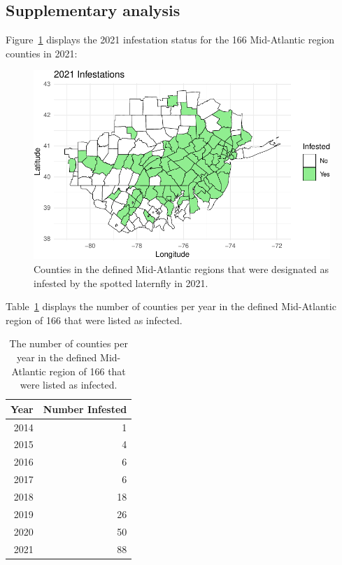 \documentclass[
  letterpaper,
  DIV=11,
  numbers=noendperiod]{scrartcl}
\begin{document}
\hypertarget{supplementary-analysis}{%
\subsection{Supplementary analysis}\label{supplementary-analysis}}

Figure~\ref{fig-figure-1} displays the 2021 infestation status for the
166 Mid-Atlantic region counties in 2021:

\begin{figure}

{\centering \includegraphics{revisions_statistical_analysis_files/figure-pdf/fig-figure-1-1.pdf}

}

\caption{\label{fig-figure-1}Counties in the defined Mid-Atlantic
regions that were designated as infested by the spotted laternfly in
2021.}

\end{figure}

Table~\ref{tbl-infestations} displays the number of counties per year in
the defined Mid-Atlantic region of 166 that were listed as infected.

\hypertarget{tbl-infestations}{}
\begin{table}
\caption{\label{tbl-infestations}The number of counties per year in the defined Mid-Atlantic region of
166 that were listed as infected. }\tabularnewline

\centering
\begin{tabular}{r|r}
\hline
Year & Number Infested\\
\hline
2014 & 1\\
\hline
2015 & 4\\
\hline
2016 & 6\\
\hline
2017 & 6\\
\hline
2018 & 18\\
\hline
2019 & 26\\
\hline
2020 & 50\\
\hline
2021 & 88\\
\hline
\end{tabular}
\end{table}
\end{document}
